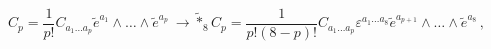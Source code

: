 \begin{equation}
C_p=\frac{1}{p!}C_{a_1\ldots a_p}\tilde e^{a_1}\wedge \ldots \wedge
\tilde e^{a_p}\ \rightarrow \tilde *_8 C_{p}=
\frac{1}{p!(8-p)!}C_{a_1\ldots a_p} \varepsilon ^{a_1\ldots a_8}\tilde
e^{a_{p+1}}\wedge \ldots \wedge \tilde e^{a_8}\,,
\end{equation}

